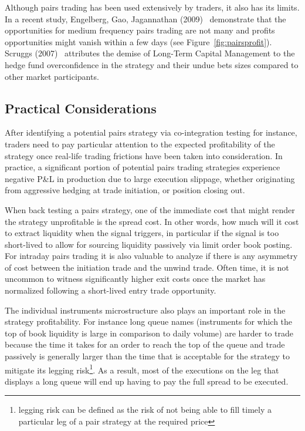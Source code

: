 Although pairs trading has been used extensively by traders, it also has its limits. In a recent study, Engelberg, Gao, Jagannathan (2009)~\cite{engelberg2009anatomy} demonstrate that the opportunities for medium frequency pairs trading are not many and profits opportunities might vanish within a few days (see Figure~\ref{fig:pairsprofit}). Scruggs (2007)~\cite{scruggs} attributes the demise of Long-Term Capital Management to the hedge fund overconfidence in the strategy and their undue bets sizes compared to other market participants.


\subsection{Practical Considerations}


After identifying a potential pairs strategy via co-integration testing for instance, traders need to pay particular attention to the expected profitability of the strategy once real-life trading frictions have been taken into consideration. In practice, a significant portion of potential pairs trading strategies experience negative P\&L in production due to large execution slippage, whether originating from aggressive hedging at trade initiation, or position closing out.


When back testing a pairs strategy, one of the immediate cost that might render the strategy unprofitable is the spread cost. In other words, how much will it cost to extract liquidity when the signal triggers, in particular if the signal is too short-lived to allow for sourcing liquidity passively via limit order book posting. For intraday pairs trading it is also valuable to analyze if there is any asymmetry of cost between the initiation trade and the unwind trade. Often time, it is not uncommon to witness significantly higher exit costs once the market has normalized following a short-lived entry trade opportunity. 


The individual instruments microstructure also plays an important role in the strategy profitability. For instance long queue names  (instruments for which the top of book liquidity is large in comparison to daily volume)  are harder to trade because the time it takes for an order to reach the top of the queue and trade passively is generally larger than the time that is acceptable for the strategy to mitigate its legging risk\footnote{legging risk can be defined as the risk of not being able to fill timely a particular leg of a pair strategy at the required price}. As a result, most of the executions on the leg that displays a long queue will end up having to pay the full spread to be executed. 


